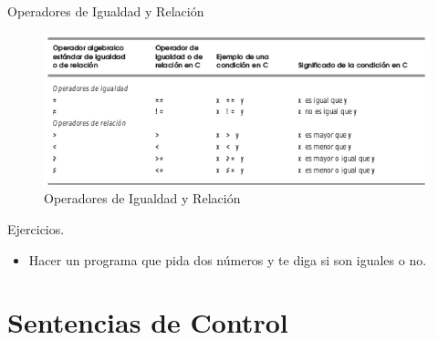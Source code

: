 \begin{frame}{Operadores de Igualdad y Relación}

\begin{figure}[htbp]
\centering
\includegraphics{operadores-igual-rel.jpg}
\caption{Operadores de Igualdad y Relación}
\end{figure}

\end{frame}

\begin{frame}{Ejercicios.}

\begin{itemize}
\itemsep1pt\parskip0pt
\item
  Hacer un programa que pida dos números y te diga si son iguales o no.
\end{itemize}

\end{frame}

\section{Sentencias de Control}\label{sentencias-de-control}

